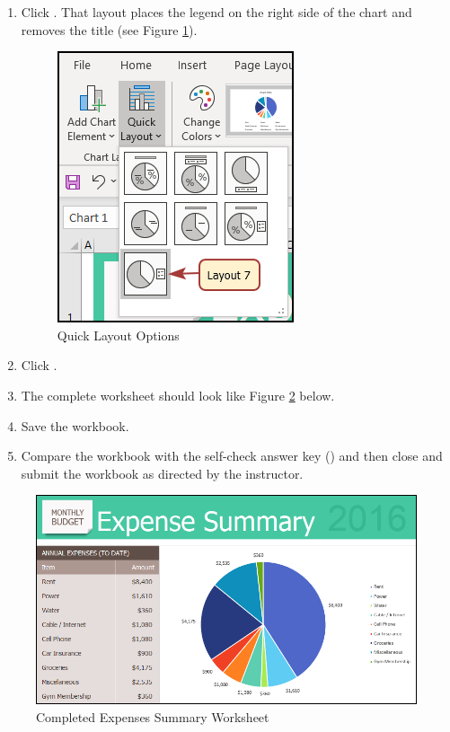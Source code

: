 \begin{enumerate}[resume]
	\item Click . That layout places the legend on the right side of the chart and removes the title (see Figure \ref{06:fig07a}).

	\begin{figure}[H]
		\centering
		\includegraphics[width=\maxwidth{.60\linewidth}]{gfx/ch06_fig07a}
		\caption{Quick Layout Options}
		\label{06:fig07a}
	\end{figure}

	\item Click .
	\item The complete  worksheet should look like Figure \ref{06:fig08} below.
	\item Save the  workbook. 
	\item Compare the workbook with the self-check answer key () and then close and submit the  workbook as directed by the instructor.
\end{enumerate}

\begin{figure}[H]
	\centering
	\includegraphics[width=\maxwidth{.95\linewidth}]{gfx/ch06_fig08}
	\caption{Completed Expenses Summary Worksheet}
	\label{06:fig08}
\end{figure}

